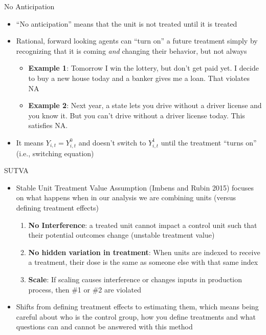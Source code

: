 \documentclass{beamer}
\begin{document}
\begin{frame}{No Anticipation}

\begin{itemize}
\item  ``No anticipation''  means that the unit is not treated until it is treated
\item Rational, forward looking agents can ``turn on'' a future treatment simply by recognizing that it is coming \emph{and} changing their behavior, but not always
	\begin{itemize}
	\item \textbf{Example 1}: Tomorrow I win the lottery, but don't get paid yet. I decide to buy a new house today and a banker gives me a loan. That violates NA
	\item \textbf{Example 2}: Next year, a state lets you drive without a driver license and you know it. But you can't drive without a driver license today.  This satisfies NA.
	\end{itemize}
\item It means $Y_{i,t}=Y^0_{i,t}$ and doesn't switch to $Y^1_{i,t}$ until the treatment ``turns on'' (i.e., switching equation)

\end{itemize}


\end{frame}





\begin{frame}{SUTVA}

\begin{itemize}
\item Stable Unit Treatment Value Assumption (Imbens and Rubin 2015) focuses on what happens when in our analysis we are combining units (versus defining treatment effects)
	\begin{enumerate}
	\item \textbf{No Interference}: a treated unit cannot impact a control unit such that their potential outcomes change (unstable treatment value)
	\item \textbf{No hidden variation in treatment}: When units are indexed to receive a treatment, their dose is the same as someone else with that same index
	\item \textbf{Scale}: If scaling causes interference or changes inputs in production process, then \#1 or \#2 are violated
	\end{enumerate}
\item Shifts from defining treatment effects to estimating them, which means being careful about who is the control group, how you define treatments and what questions can and cannot be answered with this method
\end{itemize}

\end{frame}
\end{document}

